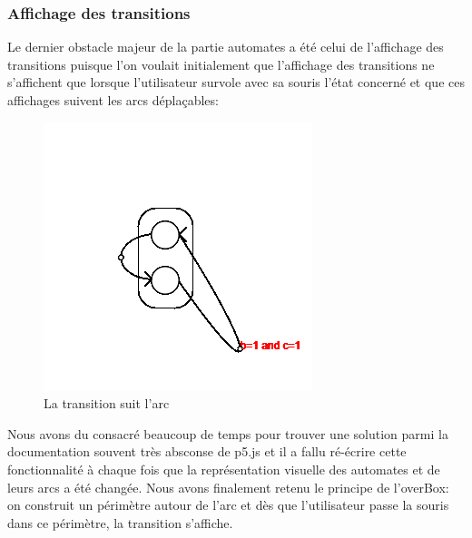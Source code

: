 \subsubsection{Affichage des transitions}
Le dernier obstacle majeur de la partie automates a été celui de l'affichage des transitions puisque l'on voulait initialement que l'affichage des transitions ne s'affichent que lorsque l'utilisateur survole avec sa souris l'état concerné et que ces affichages suivent les arcs déplaçables: 
\begin{figure}
  \centering
\includegraphics[scale=1]{images/transitions.png} 
\caption{La transition suit l'arc}
\end{figure}
Nous avons du consacré beaucoup de temps pour trouver une solution parmi la documentation souvent très absconse de p5.js et il a fallu ré-écrire cette fonctionnalité à chaque fois que la représentation visuelle des automates et de leurs arcs a été changée. Nous avons finalement retenu le principe de l'overBox: on construit un périmètre autour de l'arc et dès que l'utilisateur passe la souris dans ce périmètre, la transition s'affiche.
